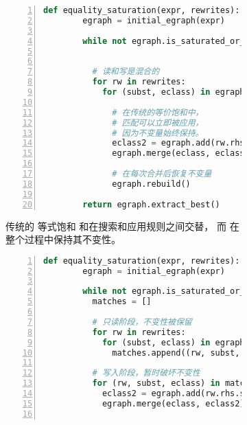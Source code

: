 \begin{figure}
  \begin{subfigure}[t]{0.47\linewidth}
    \begin{lstlisting}[language=Python, gobble=6, numbers=left, basicstyle=\scriptsize\ttfamily]
      def equality_saturation(expr, rewrites):
        egraph = initial_egraph(expr)

        while not egraph.is_saturated_or_timeout():


          # 读和写是混合的
          for rw in rewrites:
            for (subst, eclass) in egraph.ematch(rw.lhs):

              # 在传统的等价饱和中，
              # 匹配可以立即被应用，
              # 因为不变量始终保持。
              eclass2 = egraph.add(rw.rhs.subst(subst))
              egraph.merge(eclass, eclass2)

              # 在每次合并后恢复不变量
              egraph.rebuild()

        return egraph.extract_best()
    \end{lstlisting}
    \caption{
      传统的 等式饱和 和在搜索和应用规则之间交替，
      而 \egraph 在整个过程中保持其不变性。%
    }
    \label{fig:eq-sat-code1}
  \end{subfigure}
  \hfill
  \begin{subfigure}[t]{0.47\linewidth}
    \begin{lstlisting}[language=Python, gobble=6, basicstyle=\scriptsize\ttfamily, numbers=left]
      def equality_saturation(expr, rewrites):
        egraph = initial_egraph(expr)

        while not egraph.is_saturated_or_timeout():
          matches = []

          # 只读阶段，不变性被保留
          for rw in rewrites:
            for (subst, eclass) in egraph.ematch(rw.lhs):
              matches.append((rw, subst, eclass))

          # 写入阶段，暂时破坏不变性
          for (rw, subst, eclass) in matches:
            eclass2 = egraph.add(rw.rhs.subst(subst))
            egraph.merge(eclass, eclass2)


\end{lstlisting}
\end{subfigure}
\end{figure}
